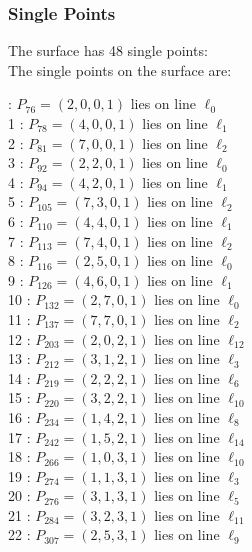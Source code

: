 \documentclass{article}
\begin{document}
{\subsubsection*{Single Points}
The surface has 48 single points:\\
The single points on the surface are:\\
\begin{multicols}{2}
 : $P_{76}=( 2, 0, 0, 1 )$ lies on line $\ell_{0}$\\
1 : $P_{78}=( 4, 0, 0, 1 )$ lies on line $\ell_{1}$\\
2 : $P_{81}=( 7, 0, 0, 1 )$ lies on line $\ell_{2}$\\
3 : $P_{92}=( 2, 2, 0, 1 )$ lies on line $\ell_{0}$\\
4 : $P_{94}=( 4, 2, 0, 1 )$ lies on line $\ell_{1}$\\
5 : $P_{105}=( 7, 3, 0, 1 )$ lies on line $\ell_{2}$\\
6 : $P_{110}=( 4, 4, 0, 1 )$ lies on line $\ell_{1}$\\
7 : $P_{113}=( 7, 4, 0, 1 )$ lies on line $\ell_{2}$\\
8 : $P_{116}=( 2, 5, 0, 1 )$ lies on line $\ell_{0}$\\
9 : $P_{126}=( 4, 6, 0, 1 )$ lies on line $\ell_{1}$\\
10 : $P_{132}=( 2, 7, 0, 1 )$ lies on line $\ell_{0}$\\
11 : $P_{137}=( 7, 7, 0, 1 )$ lies on line $\ell_{2}$\\
12 : $P_{203}=( 2, 0, 2, 1 )$ lies on line $\ell_{12}$\\
13 : $P_{212}=( 3, 1, 2, 1 )$ lies on line $\ell_{3}$\\
14 : $P_{219}=( 2, 2, 2, 1 )$ lies on line $\ell_{6}$\\
15 : $P_{220}=( 3, 2, 2, 1 )$ lies on line $\ell_{10}$\\
16 : $P_{234}=( 1, 4, 2, 1 )$ lies on line $\ell_{8}$\\
17 : $P_{242}=( 1, 5, 2, 1 )$ lies on line $\ell_{14}$\\
18 : $P_{266}=( 1, 0, 3, 1 )$ lies on line $\ell_{10}$\\
19 : $P_{274}=( 1, 1, 3, 1 )$ lies on line $\ell_{3}$\\
20 : $P_{276}=( 3, 1, 3, 1 )$ lies on line $\ell_{5}$\\
21 : $P_{284}=( 3, 2, 3, 1 )$ lies on line $\ell_{11}$\\
22 : $P_{307}=( 2, 5, 3, 1 )$ lies on line $\ell_{9}$\\

\end{multicols}}
\end{document}
